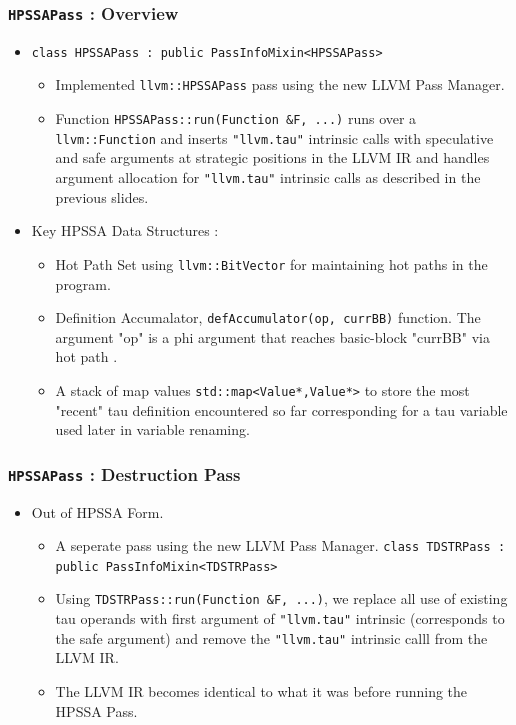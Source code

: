 \documentclass[aspectratio=169, compress]{beamer}
\begin{document}
\begin{frame}
	\frametitle{\texttt{HPSSAPass} : Overview}
	\begin{itemize}
		\item \texttt{class HPSSAPass : public PassInfoMixin<HPSSAPass>}
		\begin{itemize}
			\footnotesize
			\item Implemented \texttt{llvm::HPSSAPass} pass using the new LLVM Pass Manager. 
			\item Function \texttt{HPSSAPass::run(Function &F, ...)}  runs over a \texttt{llvm::Function} and inserts \texttt{"llvm.tau"} intrinsic calls with speculative and safe arguments at strategic positions in the LLVM IR and handles argument allocation for  \texttt{"llvm.tau"} intrinsic calls as described in the previous slides. \pause
		\end{itemize}
		\item Key HPSSA Data Structures :  \pause
		\begin{itemize}
			\footnotesize
			\item Hot Path Set using \texttt{llvm::BitVector} for maintaining \color{red} hot paths \color{black} in the program. \pause
			\item Definition Accumalator, \texttt{defAccumulator(op, currBB)} function. %
			The argument "op" is a phi argument that reaches basic-block "currBB" via \color{red} hot path \color{black}. \pause
			\item A stack of map values \texttt{std::map<Value*,Value*>} to store the most "recent" tau definition encountered so far corresponding for a tau variable used later in variable renaming. 
		\end{itemize}
	\end{itemize}
\end{frame}

\begin{frame}
	\frametitle{\texttt{HPSSAPass} : Destruction Pass}
	\begin{itemize}
		\item Out of HPSSA Form. 
		\begin{itemize}
			\item A seperate pass using the new LLVM Pass Manager. \texttt{class TDSTRPass : public PassInfoMixin<TDSTRPass>} \pause
			\item Using \texttt{TDSTRPass::run(Function &F, ...)}, we replace all use of existing tau operands with first argument of  \texttt{"llvm.tau"} intrinsic (corresponds to the safe argument) and remove the \texttt{"llvm.tau"} intrinsic calll from the LLVM IR.
			\item The LLVM IR becomes identical to what it was before running the HPSSA Pass. 
		\end{itemize}
	\end{itemize}
\end{frame}
\end{document}
